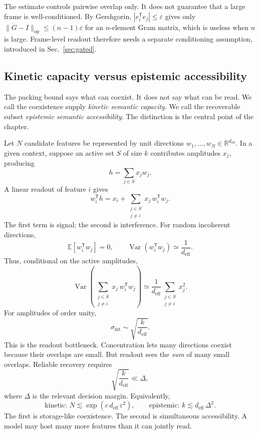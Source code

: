 \documentclass[
  aps,
  reprint,
  superscriptaddress,
  floatfix,
  nofootinbib,
  longbibliography
]{revtex4-2}
\newcommand{\R}{\mathbb{R}}
\newcommand{\E}{\mathbb{E}}
\newcommand{\deff}{d_{\mathrm{eff}}}
\newcommand{\sint}{\sigma_{\mathrm{int}}}
\newcommand{\T}{^{\mathsf{T}}}
\newcommand{\opnorm}[1]{\lVert #1 \rVert_{\mathrm{op}}}
\DeclareMathOperator{\Var}{Var}
\begin{document}
The estimate controls pairwise overlap only. It does not guarantee that
a large frame is well-conditioned. By Gershgorin,
$|e_i\T e_j|\le\varepsilon$ gives only
$\opnorm{G-I}\le(n-1)\varepsilon$ for an $n$-element Gram matrix, which
is useless when $n$ is large. Frame-level readout therefore needs a
separate conditioning assumption, introduced in Sec.~\ref{sec:gated}.

\subsection{Kinetic capacity versus epistemic accessibility}
\label{sec:kinetic-epistemic}

The packing bound says what can coexist. It does not say what can be
read. We call the coexistence supply \emph{kinetic semantic capacity}.
We call the recoverable subset \emph{epistemic semantic accessibility}.
The distinction is the central point of the chapter.

Let $N$ candidate features be represented by unit directions
$w_1,\dots,w_N\in\R^{\deff}$. In a given context, suppose an active set
$S$ of size $k$ contributes amplitudes $x_j$, producing
%
\begin{equation}
\label{eq:hidden}
h=\sum_{j\in S}x_j w_j .
\end{equation}
%
A linear readout of feature $i$ gives
%
\begin{equation}
\label{eq:readout}
w_i\T h
=
x_i+
\sum_{\substack{j\in S\\ j\neq i}}
x_j\,w_i\T w_j .
\end{equation}
%
The first term is signal; the second is interference. For random
incoherent directions,
%
\begin{equation}
\label{eq:moments}
\E[w_i\T w_j]=0,
\qquad
\Var(w_i\T w_j)\simeq \frac{1}{\deff}.
\end{equation}
%
Thus, conditional on the active amplitudes,
%
\begin{equation}
\label{eq:intvar}
\Var\!\left(
\sum_{\substack{j\in S\\ j\neq i}}
x_j\,w_i\T w_j
\right)
\simeq
\frac{1}{\deff}
\sum_{\substack{j\in S\\ j\neq i}}x_j^2 .
\end{equation}
%
For amplitudes of order unity,
%
\begin{equation}
\label{eq:sint}
\sint\sim\sqrt{\frac{k}{\deff}} .
\end{equation}
%
This is the readout bottleneck. Concentration lets many directions
coexist because their overlaps are small. But readout sees the
\emph{sum} of many small overlaps. Reliable recovery requires
%
\begin{equation}
\label{eq:snr}
\sqrt{\frac{k}{\deff}}\ll \Delta,
\end{equation}
%
where $\Delta$ is the relevant decision margin. Equivalently,
%
\begin{equation}
\label{eq:dual}
\text{kinetic: }N\lesssim\exp(c\,\deff\,\varepsilon^{2}),
\qquad
\text{epistemic: }k\lesssim\deff\,\Delta^{2}.
\end{equation}
%
The first is storage-like coexistence. The second is simultaneous
accessibility. A model may host many more features than it can jointly
read.
\end{document}
